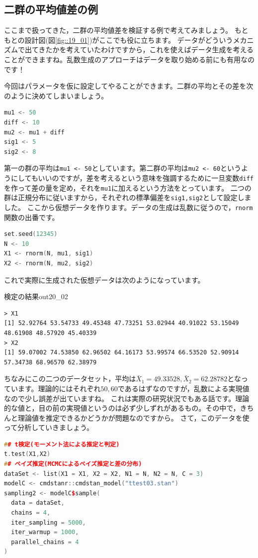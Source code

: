 \documentclass{ltjsbook}
\begin{document}
\subsection{二群の平均値差の例}
ここまで扱ってきた，二群の平均値差を検証する例で考えてみましょう。
もともとの設計図(図\ref{fig::19_01})がここでも役に立ちます。
データがどういうメカニズムで出てきたかを考えていたわけですから，これを使えばデータ生成を考えることができますね。乱数生成のアプローチはデータを取り始める前にも有用なのです！

今回はパラメータを仮に設定してやることができます。二群の平均とその差を次のように決めてしまいましょう。
\begin{lstlisting}[language=c++,label={code::20_02},caption={平均値差の設定}]
mu1 <- 50
diff <- 10
mu2 <- mu1 + diff
sig1 <- 5
sig2 <- 8
\end{lstlisting}

第一の群の平均は\verb|mu1 <- 50|としています。第二群の平均は\verb|mu2 <- 60|というようにしてもいいのですが，差を考えるという意味を強調するために一旦変数\verb|diff|を作って差の量を定め，それを\verb|mu1|に加えるという方法をとっています。
二つの群は正規分布に従いますから，それぞれの標準偏差を\verb|sig1,sig2|として設定しました。
ここから仮想データを作ります。データの生成は乱数に従うので，\verb|rnorm|関数の出番です。
\begin{lstlisting}[language=c++,label={code::20_03},caption={仮想データの生成}]
set.seed(12345)
N <- 10
X1 <- rnorm(N, mu1, sig1)
X2 <- rnorm(N, mu2, sig2)
\end{lstlisting}
これで実際に生成された仮想データは次のようになっています。
\begin{Rscreen}{検定の結果}{out20_02}
\begin{verbatim}
> X1
[1] 52.92764 53.54733 49.45348 47.73251 53.02944 40.91022 53.15049 48.61908 48.57920 45.40339
> X2
[1] 59.07002 74.53850 62.96502 64.16173 53.99574 66.53520 52.90914 57.34738 68.96570 62.38979
\end{verbatim}
\end{Rscreen}
ちなみにこの二つのデータセット，平均は$\bar{X}_1=49.33528,\bar{X}_2=62.28782$となっています。理論的にはそれぞれ$50,60$であるはずなのですが，乱数による実現値なので少し誤差が出ていますね。
これは実際の研究状況でもある話です。理論的な値と，目の前の実現値というのは必ず少しずれがあるもの。その中で，きちんと理論値を推定できるかどうかが問題なのですから。
さて，このデータを使って分析していきましょう。
\begin{lstlisting}[language=c++,label={code::20_03},caption={パラメータリカバリ・検証}]
## t検定(モーメント法による推定と判定)
t.test(X1,X2)
## ベイズ推定(MCMCによるベイズ推定と差の分布)
dataSet <- list(X1 = X1, X2 = X2, N1 = N, N2 = N, C = 3)
modelC <- cmdstanr::cmdstan_model("ttest03.stan")
sampling2 <- modelC$sample(
  data = dataSet,
  chains = 4,
  iter_sampling = 5000,
  iter_warmup = 1000,
  parallel_chains = 4
)
\end{lstlisting}
\end{document}
